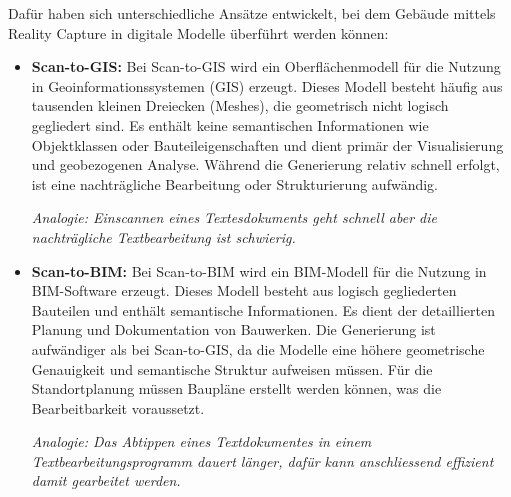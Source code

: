 \begin{German}
    Dafür haben sich unterschiedliche Ansätze entwickelt, bei dem Gebäude mittels Reality Capture in digitale Modelle überführt werden können:

    \begin{itemize}
        \item \textbf{Scan-to-GIS:} Bei Scan-to-GIS wird ein Oberflächenmodell für die Nutzung in Geoinformationssystemen (GIS) erzeugt. Dieses Modell besteht häufig aus tausenden kleinen Dreiecken (Meshes), die geometrisch nicht logisch gegliedert sind. Es enthält keine semantischen Informationen wie Objektklassen oder Bauteileigenschaften und dient primär der Visualisierung und geobezogenen Analyse. Während die Generierung relativ schnell erfolgt, ist eine nachträgliche Bearbeitung oder Strukturierung aufwändig.
        
        \textit{Analogie: Einscannen eines Textesdokuments geht schnell aber die nachträgliche Textbearbeitung ist schwierig.}

        \item \textbf{Scan-to-BIM:} Bei Scan-to-BIM wird ein BIM-Modell für die Nutzung in BIM-Software erzeugt. Dieses Modell besteht aus logisch gegliederten Bauteilen und enthält semantische Informationen. Es dient der detaillierten Planung und Dokumentation von Bauwerken. Die Generierung ist aufwändiger als bei Scan-to-GIS, da die Modelle eine höhere geometrische Genauigkeit und semantische Struktur aufweisen müssen. Für die Standortplanung müssen Baupläne erstellt werden können, was die Bearbeitbarkeit voraussetzt. 
        
        \textit{Analogie: Das Abtippen eines Textdokumentes in einem Textbearbeitungsprogramm dauert länger, dafür kann anschliessend effizient damit gearbeitet werden.} 
    \end{itemize}
\end{German}


